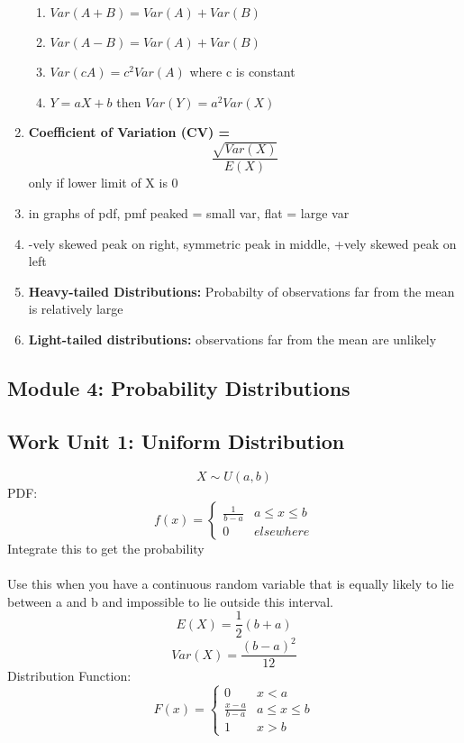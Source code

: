 \documentclass[a4paper,10pt]{article}
\begin{document}
\begin{enumerate}
	\begin{enumerate}
		\item $Var(A+B) = Var(A) + Var(B)$
		\item $Var(A-B) = Var(A) + Var(B)$
		\item $Var(cA) = c^2Var(A)$ where c is constant
		\item $Y = aX +b$ then $Var(Y) = a^2Var(X)$
	\end{enumerate}
	\item \textbf{Coefficient of Variation (CV) = } $$ \frac{\sqrt{Var(X)}}{E(X)} $$only if lower limit of X is 0
	\item in graphs of pdf, pmf peaked = small  var, flat = large var
	\item -vely skewed peak on right, symmetric peak in middle, +vely skewed peak on left
	\item \textbf{Heavy-tailed Distributions:} Probabilty of observations far from the mean is relatively large
	\item \textbf{Light-tailed distributions:} observations far from the mean are unlikely
\end{enumerate}

\subsection{Module 4: Probability Distributions}
\subsection{Work Unit 1: Uniform Distribution}
\[
	X\sim U(a,b)
\]
PDF:
\[
	f(x) =\left\{ \begin{array} {lr} \frac{1}{b-a} & a\leq x \leq b \\ 0 & elsewhere \end{array}
\]
Integrate this to get the probability
\\ \\
Use this when you have a continuous random variable that is equally likely to lie between a and b and impossible to lie outside this interval.
\\
\[
	E(X) = \frac{1}{2}(b+a)
\]
\[
	Var(X) =\frac{(b-a)^2}{12}
\]
Distribution Function:
\[
	F(x) = \left\{
	\begin{array}
	{lr}
	0 &x<a \\
	\frac{x-a}{b-a} & a\leq x\leq b\\
	1 & x>b
	\end{array}
\]
\end{document}

